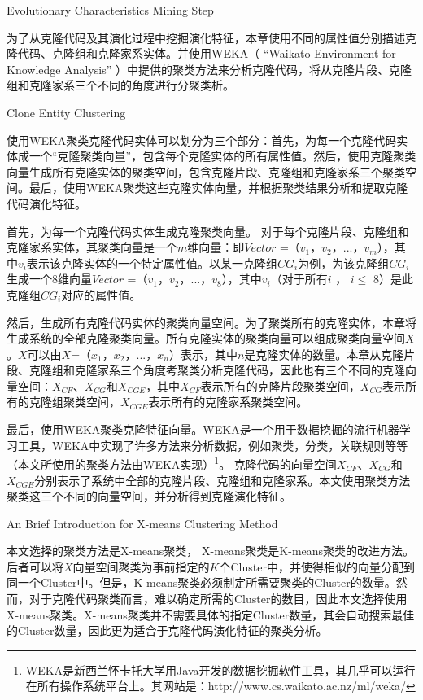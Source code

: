 {Evolutionary Characteristics Mining Step}

为了从克隆代码及其演化过程中挖掘演化特征，本章使用不同的属性值分别描述克隆代码、克隆组和克隆家系实体。并使用WEKA（ “Waikato Environment for Knowledge Analysis” \cite{hall2009weka}）中提供的聚类方法来分析克隆代码，将从克隆片段、克隆组和克隆家系三个不同的角度进行分聚类析。

{Clone Entity Clustering}

使用WEKA聚类克隆代码实体可以划分为三个部分：首先，为每一个克隆代码实体成一个“克隆聚类向量”，包含每个克隆实体的所有属性值。然后，使用克隆聚类向量生成所有克隆实体的聚类空间，包含克隆片段、克隆组和克隆家系三个聚类空间。最后，使用WEKA聚类这些克隆实体向量，并根据聚类结果分析和提取克隆代码演化特征。

 首先，为每一个克隆代码实体生成克隆聚类向量。 对于每个克隆片段、克隆组和克隆家系实体，其聚类向量是一个$m$维向量：即{$Vector$ ={（$v_1$，$v_2$，$...$，$v_m$）}}，其中$v_i$表示该克隆实体的一个特定属性值。以某一克隆组{$CG_i$}为例，为该克隆组{$CG_i$}生成一个8维向量{$Vector$ =（$v_1$，$v_2$，$...$，$v_8$）}，其中$v_i$（对于所有$i$ ， $i \leq $ 8）是此克隆组{$CG_i$}对应的属性值。
 
然后，生成所有克隆代码实体的聚类向量空间。为了聚类所有的克隆实体，本章将生成系统的全部克隆聚类向量。所有克隆实体的聚类向量可以组成聚类向量空间$X$。$X$可以由{$X$={（$x_1$，$x_2$，$...$，$x_n$）}}表示，其中$n$是克隆实体的数量。本章从克隆片段、克隆组和克隆家系三个角度考聚类分析克隆代码，因此也有三个不同的克隆向量空间：$X_{CF}$、$X_{CG}$和$X_{CGE}$，其中$X_{CF}$表示所有的克隆片段聚类空间，$X_{CG}$表示所有的克隆组聚类空间，$X_{CGE}$表示所有的克隆家系聚类空间。
  
最后，使用WEKA聚类克隆特征向量。WEKA是一个用于数据挖掘的流行机器学习工具，WEKA中实现了许多方法来分析数据，例如聚类，分类，关联规则等等（本文所使用的聚类方法由WEKA实现）\footnote{WEKA是新西兰怀卡托大学用Java开发的数据挖掘软件工具，其几乎可以运行在所有操作系统平台上。其网站是：http://www.cs.waikato.ac.nz/ml/weka/}。 克隆代码的向量空间$X_{CF}$、$X_{CG}$和$X_{CGE}$分别表示了系统中全部的克隆片段、克隆组和克隆家系。本文使用聚类方法聚类这三个不同的向量空间，并分析得到克隆演化特征。

{An Brief Introduction for X-means Clustering Method}

本文选择的聚类方法是X-means聚类\cite{pelleg2000x}， X-means聚类是K-means聚类\cite{arthur2007k}的改进方法。后者可以将$X$向量空间聚类为事前指定的$K$个Cluster中，并使得相似的向量分配到同一个Cluster中。但是，K-means聚类必须制定所需要聚类的Cluster的数量。然而，对于克隆代码聚类而言，难以确定所需的Cluster的数目，因此本文选择使用X-means聚类。X-means聚类并不需要具体的指定Cluster数量，其会自动搜索最佳的Cluster数量，因此更为适合于克隆代码演化特征的聚类分析。

